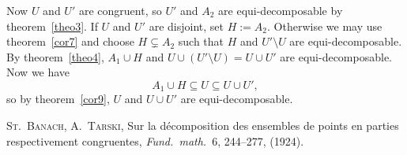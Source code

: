 \documentclass[12pt]{article}
\begin{document}
Now $U$ and $U'$ are congruent, so $U'$ and $A_2$ are
equi-decomposable by theorem~\ref{theo3}. If $U$ and $U'$ are
disjoint, set $H:=A_2$. Otherwise we may use theorem~\ref{cor7} and
choose $H\subsetneq A_2$ such that $H$ and $U'\setminus U$ are
equi-decomposable. By theorem~\ref{theo4}, $A_1\cup H$ and $U\cup
(U'\setminus U)=U\cup U'$ are equi-decomposable. Now we have
\begin{equation*}
A_1\cup H\subseteq U\subseteq U\cup U',
\end{equation*}
so by theorem~\ref{cor9}, $U$ and $U\cup U'$ are equi-decomposable.

\begin{thebibliography}{BT}

 \textsc{St.~Banach, A.~Tarski}, Sur la d\'{e}composition
  des ensembles de points en parties respectivement congruentes,
  \emph{Fund.\ math.}\ 6, 244--277, (1924).

\end{thebibliography}
\end{document}
